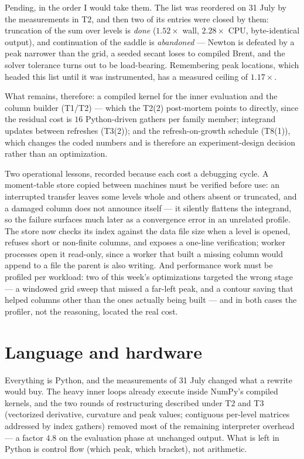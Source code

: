 \documentclass[11pt]{article}
\begin{document}
Pending, in the order I would take them.  The list was reordered on
31 July by the measurements in T2, and then two of its entries were
closed by them: truncation of the sum over levels is \emph{done}
($1.52\times$ wall, $2.28\times$ CPU, byte-identical output), and
continuation of the saddle is \emph{abandoned} --- Newton is defeated
by a peak narrower than the grid, a seeded secant loses to compiled
Brent, and the solver tolerance turns out to be load-bearing.
Remembering peak locations, which headed this list until it was
instrumented, has a measured ceiling of $1.17\times$.

What remains, therefore: a compiled kernel for the inner evaluation
and the column builder (T1/T2) --- which the T2(2) post-mortem points
to directly, since the residual cost is $16$ Python-driven gathers per
family member; integrand updates between refreshes (T3(2)); and the
refresh-on-growth schedule (T8(1)), which changes the coded numbers
and is therefore an experiment-design decision rather than an
optimization.

Two operational lessons, recorded because each cost a debugging
cycle.  A moment-table store copied between machines must be
verified before use: an interrupted transfer leaves some levels
whole and others absent or truncated, and a damaged column does not
announce itself --- it silently flattens the integrand, so the
failure surfaces much later as a convergence error in an unrelated
profile.  The store now checks its index against the data file size
when a level is opened, refuses short or non-finite columns, and
exposes a one-line verification; worker processes open it read-only,
since a worker that built a missing column would append to a file
the parent is also writing.  And performance work must be profiled
per workload: two of this week's optimizations targeted the wrong
stage --- a windowed grid sweep that missed a far-left peak, and a
contour saving that helped columns other than the ones actually
being built --- and in both cases the profiler, not the reasoning,
located the real cost.

\section*{Language and hardware}

Everything is Python, and the measurements of 31 July changed what a
rewrite would buy.  The heavy inner loops already execute inside
NumPy's compiled kernels, and the two rounds of restructuring
described under T2 and T3 (vectorized derivative, curvature and peak
values; contiguous per-level matrices addressed by index gathers)
removed most of the remaining interpreter overhead --- a factor
$4.8$ on the evaluation phase at unchanged output.  What is left in
Python is control flow (which peak, which bracket), not arithmetic.
\end{document}
